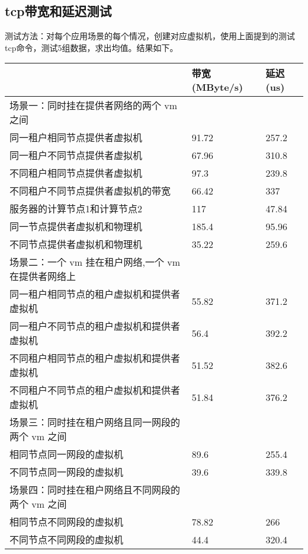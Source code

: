 \documentclass[a4paper,left=1.5cm,right=1.5cm,11pt]{article}
\begin{document}
\subsection{tcp带宽和延迟测试}
测试方法：对每个应用场景的每个情况，创建对应虚拟机，使用上面提到的测试tcp命令，测试5组数据，求出均值。结果如下。
\begin{center}
\begin{tabular}[c]{|l|l|l|}
\hline
 &  带宽(MByte/s)&延迟(us) \\
\hline
 场景一：同时挂在提供者网络的两个 vm 之间 &  &\\
\hline
 同一租户相同节点提供者虚拟机 & 91.72&257.2 \\
\hline
 同一租户不同节点提供者虚拟机 & 67.96&310.8 \\
 \hline
 不同租户相同节点提供者虚拟机& 97.3&239.8 \\
 \hline
 不同租户不同节点提供者虚拟机的带宽& 66.42&337 \\
 \hline
 服务器的计算节点1和计算节点2& 117&47.84 \\
 \hline
 同一节点提供者虚拟机和物理机& 185.4&95.96 \\
 \hline
 不同节点提供者虚拟机和物理机& 35.22&259.6 \\
 \hline
 \hline
 场景二：一个 vm 挂在租户网络,一个 vm 在提供者网络上& \\
 \hline
 同一租户相同节点的租户虚拟机和提供者虚拟机& 55.82&371.2 \\
 \hline
 同一租户不同节点的租户虚拟机和提供者虚拟机& 56.4&392.2 \\
 \hline
 不同租户相同节点的租户虚拟机和提供者虚拟机& 51.52&382.6 \\
 \hline
 不同租户不同节点的租户虚拟机和提供者虚拟机& 51.84&376.2 \\
 \hline
 \hline
 场景三：同时挂在租户网络且同一网段的两个 vm 之间& \\
 \hline
 相同节点同一网段的虚拟机& 89.6&255.4 \\
 \hline
 不同节点同一网段的虚拟机&  39.6&339.8\\
 \hline
 \hline
 场景四：同时挂在租户网络且不同网段的两个 vm 之间& \\
 \hline
 相同节点不同网段的虚拟机&  78.82&266\\
 \hline
 不同节点不同网段的虚拟机&  44.4&320.4\\

\hline
\end{tabular}
\end{center}
\end{document}
